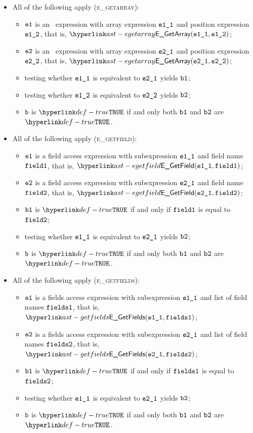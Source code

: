 \begin{itemize}
  \item All of the following apply (\textsc{e\_getarray}):
  \begin{itemize}
    \item $\texttt{e1}$ is an \arrayaccess\ expression with array expression $\texttt{e1\_1}$ and position expression $\texttt{e1\_2}$,
          that is, $\EGetArray(\veoneone, \veonetwo)$;
    \item $\texttt{e2}$ is an \arrayaccess\ expression with array expression $\texttt{e2\_1}$ and position expression $\texttt{e2\_2}$,
          that is, $\EGetArray(\vetwoone, \vetwotwo)$;
    \item testing whether $\texttt{e1\_1}$ is equivalent to $\texttt{e2\_1}$ yields $\texttt{b1}$\ProseOrTypeError;
    \item testing whether $\texttt{e1\_2}$ is equivalent to $\texttt{e2\_2}$ yields $\texttt{b2}$\ProseOrTypeError;
    \item $\texttt{b}$ is $\True$ if and only both $\texttt{b1}$ and $\texttt{b2}$ are $\True$.
  \end{itemize}

  \item All of the following apply (\textsc{e\_getfield}):
  \begin{itemize}
    \item $\texttt{e1}$ is a field access expression with subexpression $\texttt{e1\_1}$ and field name $\texttt{field1}$,
          that is, $\EGetField(\veoneone, \vfieldone)$;
    \item $\texttt{e2}$ is a field access expression with subexpression $\texttt{e2\_1}$ and field name $\texttt{field2}$,
          that is, $\EGetField(\vetwoone, \vfieldtwo)$;
    \item $\texttt{b1}$ is $\True$ if and only if $\texttt{field1}$ is equal to $\texttt{field2}$;
    \item testing whether $\texttt{e1\_1}$ is equivalent to $\texttt{e2\_1}$ yields $\texttt{b2}$\ProseOrTypeError;
    \item $\texttt{b}$ is $\True$ if and only both $\texttt{b1}$ and $\texttt{b2}$ are $\True$.
  \end{itemize}

  \item All of the following apply (\textsc{e\_getfields}):
  \begin{itemize}
    \item $\texttt{e1}$ is a fields access expression with subexpression $\texttt{e1\_1}$ and list of field names $\texttt{fields1}$,
          that is, $\EGetFields(\veoneone, \vfieldsone)$;
    \item $\texttt{e2}$ is a fields access expression with subexpression $\texttt{e2\_1}$ and list of field names $\texttt{fields2}$,
          that is, $\EGetFields(\vetwoone, \vfieldstwo)$;
    \item $\texttt{b1}$ is $\True$ if and only if $\texttt{fields1}$ is equal to $\texttt{fields2}$;
    \item testing whether $\texttt{e1\_1}$ is equivalent to $\texttt{e2\_1}$ yields $\texttt{b2}$\ProseOrTypeError;
    \item $\texttt{b}$ is $\True$ if and only both $\texttt{b1}$ and $\texttt{b2}$ are $\True$.
  \end{itemize}


\end{itemize}
